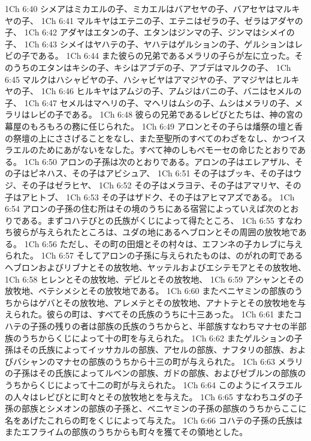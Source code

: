 1Ch 6:40  シメアはミカエルの子、ミカエルはバアセヤの子、バアセヤはマルキヤの子、
1Ch 6:41  マルキヤはエテニの子、エテニはゼラの子、ゼラはアダヤの子、
1Ch 6:42  アダヤはエタンの子、エタンはジンマの子、ジンマはシメイの子、
1Ch 6:43  シメイはヤハテの子、ヤハテはゲルションの子、ゲルションはレビの子である。
1Ch 6:44  また彼らの兄弟であるメラリの子らが左に立った。そのうちのエタンはキシの子、キシはアブデの子、アブデはマルクの子、
1Ch 6:45  マルクはハシャビヤの子、ハシャビヤはアマジヤの子、アマジヤはヒルキヤの子、
1Ch 6:46  ヒルキヤはアムジの子、アムジはバニの子、バニはセメルの子、
1Ch 6:47  セメルはマヘリの子、マヘリはムシの子、ムシはメラリの子、メラリはレビの子である。
1Ch 6:48  彼らの兄弟であるレビびとたちは、神の宮の幕屋のもろもろの務に任じられた。
1Ch 6:49  アロンとその子らは燔祭の壇と香の祭壇の上にささげることをなし、また至聖所のすべてのわざをなし、かつイスラエルのためにあがないをなした。すべて神のしもべモーセの命じたとおりである。
1Ch 6:50  アロンの子孫は次のとおりである。アロンの子はエレアザル、その子はピネハス、その子はアビシュア、
1Ch 6:51  その子はブッキ、その子はウジ、その子はゼラヒヤ、
1Ch 6:52  その子はメラヨテ、その子はアマリヤ、その子はアヒトブ、
1Ch 6:53  その子はザドク、その子はアヒマアズである。
1Ch 6:54  アロンの子孫の住む所はその境のうちにある宿営によっていえば次のとおりである。まずコハテびとの氏族がくじによって得たところ、
1Ch 6:55  すなわち彼らが与えられたところは、ユダの地にあるヘブロンとその周囲の放牧地である。
1Ch 6:56  ただし、その町の田畑とその村々は、エフンネの子カレブに与えられた。
1Ch 6:57  そしてアロンの子孫に与えられたものは、のがれの町であるヘブロンおよびリブナとその放牧地、ヤッテルおよびエシテモアとその放牧地、
1Ch 6:58  ヒレンとその放牧地、デビルとその放牧地、
1Ch 6:59  アシャンとその放牧地、ベテシメシとその放牧地である。
1Ch 6:60  またベニヤミンの部族のうちからはゲバとその放牧地、アレメテとその放牧地、アナトテとその放牧地を与えられた。彼らの町は、すべてその氏族のうちに十三あった。
1Ch 6:61  またコハテの子孫の残りの者は部族の氏族のうちからと、半部族すなわちマナセの半部族のうちからくじによって十の町を与えられた。
1Ch 6:62  またゲルションの子孫はその氏族によってイッサカルの部族、アセルの部族、ナフタリの部族、およびバシャンのマナセの部族のうちから十三の町が与えられた。
1Ch 6:63  メラリの子孫はその氏族によってルベンの部族、ガドの部族、およびゼブルンの部族のうちからくじによって十二の町が与えられた。
1Ch 6:64  このようにイスラエルの人々はレビびとに町々とその放牧地とを与えた。
1Ch 6:65  すなわちユダの子孫の部族とシメオンの部族の子孫と、ベニヤミンの子孫の部族のうちからここに名をあげたこれらの町をくじによって与えた。
1Ch 6:66  コハテの子孫の氏族はまたエフライムの部族のうちからも町々を獲てその領地とした。
